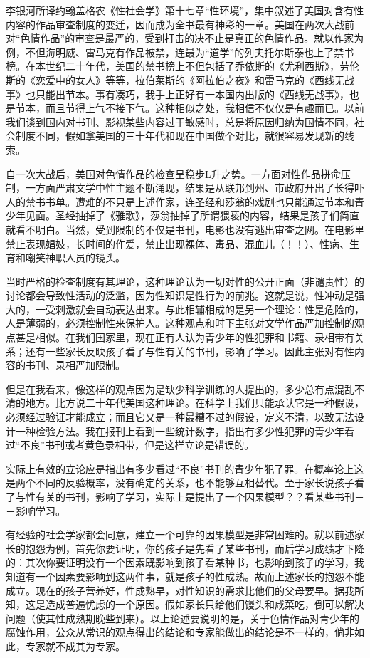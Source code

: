 李银河所译约翰盖格农《性社会学》第十七章“性环境”，集中叙述了美国对含有性内容的作品审查制度的变迁，因而成为全书最有神彩的一章。美国在两次大战前对“色情作品”的审查是最严的，受到打击的决不止是真正的色情作品。就以作家为例，不但海明威、雷马克有作品被禁，连最为“道学”的列夫托尔斯泰也上了禁书榜。在本世纪二十年代，美国的禁书榜上不但包括了乔依斯的《尤利西斯》，劳伦斯的《恋爱中的女人》等等，拉伯莱斯的《阿拉伯之夜》和雷马克的《西线无战事》也只能出节本。事有凑巧，我手上正好有一本国内出版的《西线无战事》，也是节本，而且节得上气不接下气。这种相似之处，我相信不仅仅是有趣而已。以前我们谈到国内对书刊、影视某些内容过于敏感时，总是将原因归纳为国情不同，社会制度不同，假如拿美国的三十年代和现在中国做个对比，就很容易发现新的线索。 

自一次大战后，美国对色情作品的检查呈稳步L升之势。一方面对性作品拼命压制，一方面严肃文学中性主题不断涌现，结果是从联邦到州、市政府开出了长得吓人的禁书书单。遭难的不只是上述作家，连圣经和莎翁的戏剧也只能通过节本和青少年见面。圣经抽掉了《雅歌》，莎翁抽掉了所谓猥亵的内容，结果是孩子们简直就看不明白。当然，受到限制的不仅是书刊，电影也没有逃出审查之网。在电影里禁止表现娼妓，长时间的作爱，禁止出现裸体、毒品、混血儿（！！）、性病、生育和嘲笑神职人员的镜头。 

当时严格的检查制度有其理论，这种理论认为一切对性的公开正面（非谴责性）的讨论都会导致性活动的泛滥，因为性知识是性行为的前兆。这就是说，性冲动是强大的，一受刺激就会自动表达出来。与此相辅相成的是另一个理论：性是危险的，人是薄弱的，必须控制性来保护人。这种观点和时下主张对文学作品严加控制的观点甚是相似。在我们国家里，现在正有人认为青少年的性犯罪和书籍、录相带有关系；还有一些家长反映孩子看了与性有关的书刊，影响了学习。因此主张对有性内容的书刊、录相严加限制。 

但是在我看来，像这样的观点因为是缺少科学训练的人提出的，多少总有点混乱不清的地方。比方说二十年代美国这种理论。在科学上我们只能承认它是一种假设，必须经过验证才能成立；而且它又是一种最糟不过的假设，定义不清，以致无法设计一种检验方法。我在报刊上看到一些统计数字，指出有多少性犯罪的青少年看过“不良”书刊或者黄色录相带，但是这样立论是错误的。 

实际上有效的立论应是指出有多少看过“不良”书刊的青少年犯了罪。在概率论上这是两个不同的反验概率，没有确定的关系，也不能够互相替代。至于家长说孩子看了与性有关的书刊，影响了学习，实际上是提出了一个因果模型？？看某些书刊－－影响学习。 

有经验的社会学家都会同意，建立一个可靠的因果模型是非常困难的。就以前述家长的抱怨为例，首先你要证明，你的孩子是先看了某些书刊，而后学习成绩才下降的：其次你要证明没有一个因素既影响到孩子看某种书，也影响到孩子的学习，我知道有一个因素要影响到这两件事，就是孩子的性成熟。故而上述家长的抱怨不能成立。现在的孩子营养好，性成熟早，对性知识的需求比他们的父母要早。据我所知，这是造成普遍忧虑的一个原因。假如家长只给他们馒头和咸菜吃，倒可以解决问题（使其性成熟期晚些到来）。以上论述要说明的是，关于色情作品对青少年的腐蚀作用，公众从常识的观点得出的结论和专家能做出的结论是不一样的，倘非如此，专家就不成其为专家。 

